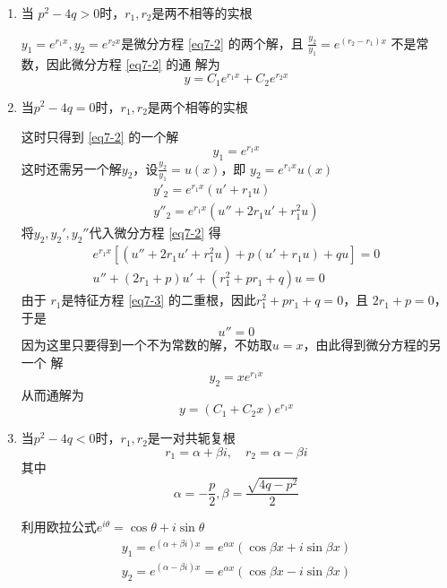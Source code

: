 \documentclass[11pt]{article}
\begin{document}
\begin{enumerate}
\item 当 \(p^2-4q>0\)时，\(r_1,r_2\)是两不相等的实根

\(y_1=e^{r_1x},y_2=e^{r_2x}\)是微分方程 \eqref{eq7-2} 的两个解，且
\(\frac{y_2}{y_1}=e^{(r_2-r_1)x}\) 不是常数，因此微分方程 \eqref{eq7-2} 的通
解为
\begin{equation*}
y=C_1e^{r_1x}+C_2e^{r_2x}
\end{equation*}
\item 当\(p^2-4q=0\)时，\(r_1,r_2\)是两个相等的实根

这时只得到 \eqref{eq7-2} 的一个解
\begin{equation*}
y_1=e^{r_1x}
\end{equation*}
这时还需另一个解\(y_2\)，设\(\frac{y_2}{y_1}=u(x)\)，即
\(y_2=e^{r_1x}u(x)\)
\begin{gather*}
y'_2=e^{r_1x}(u'+r_1u)\\
y''_2=e^{r_1x}(u''+2r_1u'+r_1^2u)
\end{gather*}
将\(y_2,y_2',y_2''\)代入微分方程 \eqref{eq7-2} 得
\begin{gather*}
e^{r_1x}[(u''+2r_1u'+r_1^2u)+p(u'+r_1u)+qu]=0\\
u''+(2r_1+p)u'+(r_1^2+pr_1+q)u=0
\end{gather*}
由于 \(r_1\)是特征方程 \eqref{eq7-3} 的二重根，因此\(r_1^2+pr_1+q=0\)，且
\(2r_1+p=0\)，于是
\begin{equation*}
u''=0
\end{equation*}
因为这里只要得到一个不为常数的解，不妨取\(u=x\)，由此得到微分方程的另一个
解
\begin{equation*}
y_2=xe^{r_1x}
\end{equation*}
从而通解为
\begin{equation*}
y=(C_1+C_2x)e^{r_1x}
\end{equation*}
\item 当\(p^2-4q<0\)时，\(r_1,r_2\)是一对共轭复根
\begin{equation*}
r_1=\alpha+\beta i,\quad r_2=\alpha-\beta i
\end{equation*}
其中
\begin{equation*}
\alpha=-\frac{p}{2},\beta=\frac{\sqrt{4q-p^2}}{2}
\end{equation*}

利用欧拉公式\(e^{i\theta}=\cos\theta+i\sin\theta\)
\begin{gather*}
y_1=e^{(\alpha+\beta i)x}=e^{\alpha x}(\cos\beta x+i\sin\beta x)\\
y_2=e^{(\alpha-\beta i)x}=e^{\alpha x}(\cos\beta x-i\sin\beta x)
\end{gather*}


\end{enumerate}
\end{document}
